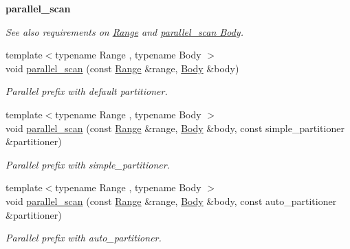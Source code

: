 \begin{Indent}{\bf parallel\+\_\+scan}\par
{\em See also requirements on \hyperlink{range_req}{Range} and \hyperlink{parallel_scan_body_req}{parallel\+\_\+scan Body}. }\begin{DoxyCompactItemize}
\item 
{\footnotesize template$<$typename Range , typename Body $>$ }\\void \hyperlink{group__algorithms_gae7eaaf124471a6c603b28fc925e8fbbb}{parallel\+\_\+scan} (const \hyperlink{classtbb_1_1blocked__range}{Range} \&range, \hyperlink{classBody}{Body} \&body)
\begin{DoxyCompactList}\small\item\em Parallel prefix with default partitioner. \end{DoxyCompactList}\item 
{\footnotesize template$<$typename Range , typename Body $>$ }\\void \hyperlink{group__algorithms_ga7ddacf5e49f1bea9b67803f2d0f57531}{parallel\+\_\+scan} (const \hyperlink{classtbb_1_1blocked__range}{Range} \&range, \hyperlink{classBody}{Body} \&body, const simple\+\_\+partitioner \&partitioner)
\begin{DoxyCompactList}\small\item\em Parallel prefix with simple\+\_\+partitioner. \end{DoxyCompactList}\item 
{\footnotesize template$<$typename Range , typename Body $>$ }\\void \hyperlink{group__algorithms_ga3548041731b7fa14f30f155541ceebb9}{parallel\+\_\+scan} (const \hyperlink{classtbb_1_1blocked__range}{Range} \&range, \hyperlink{classBody}{Body} \&body, const auto\+\_\+partitioner \&partitioner)
\begin{DoxyCompactList}\small\item\em Parallel prefix with auto\+\_\+partitioner. \end{DoxyCompactList}\end{DoxyCompactItemize}
\end{Indent}

